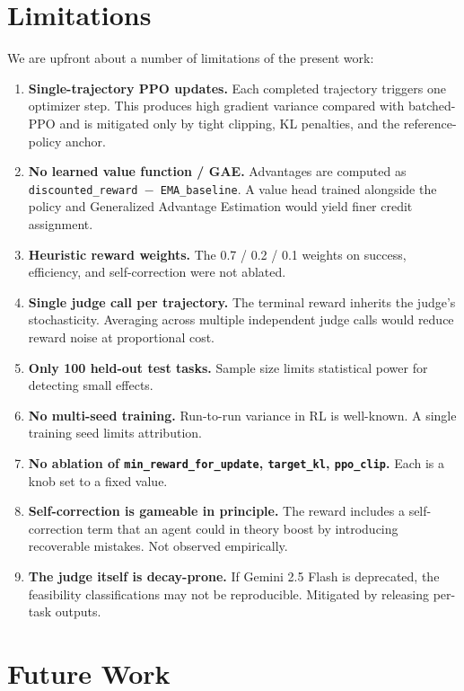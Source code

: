 \documentclass[12pt,a4paper]{report}
\begin{document}
\section{Limitations}\label{sec:limitations}

We are upfront about a number of limitations of the present work:

\begin{enumerate}
  \item \textbf{Single-trajectory PPO updates.} Each completed trajectory triggers one optimizer step. This produces high gradient variance compared with batched-PPO and is mitigated only by tight clipping, KL penalties, and the reference-policy anchor.
  \item \textbf{No learned value function / GAE.} Advantages are computed as \texttt{discounted\_reward $-$ EMA\_baseline}. A value head trained alongside the policy and Generalized Advantage Estimation would yield finer credit assignment.
  \item \textbf{Heuristic reward weights.} The 0.7 / 0.2 / 0.1 weights on success, efficiency, and self-correction were not ablated.
  \item \textbf{Single judge call per trajectory.} The terminal reward inherits the judge's stochasticity. Averaging across multiple independent judge calls would reduce reward noise at proportional cost.
  \item \textbf{Only 100 held-out test tasks.} Sample size limits statistical power for detecting small effects.
  \item \textbf{No multi-seed training.} Run-to-run variance in RL is well-known. A single training seed limits attribution.
  \item \textbf{No ablation of \texttt{min\_reward\_for\_update}, \texttt{target\_kl}, \texttt{ppo\_clip}.} Each is a knob set to a fixed value.
  \item \textbf{Self-correction is gameable in principle.} The reward includes a self-correction term that an agent could in theory boost by introducing recoverable mistakes. Not observed empirically.
  \item \textbf{The judge itself is decay-prone.} If Gemini 2.5 Flash is deprecated, the feasibility classifications may not be reproducible. Mitigated by releasing per-task outputs.
\end{enumerate}

\section{Future Work}
\end{document}
